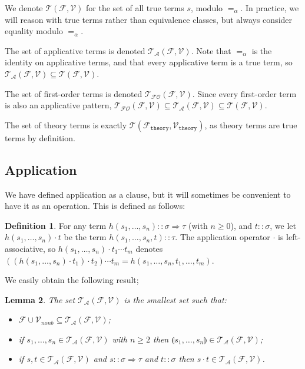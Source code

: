 \documentclass{lmcs}
\theoremstyle{theorem}\newtheorem{theorem}{Theorem}
\theoremstyle{theorem}\newtheorem{lemma}[theorem]{Lemma}
\theoremstyle{theorem}\newtheorem{corollary}[theorem]{Corollary}
\theoremstyle{definition}\newtheorem{definition}[theorem]{Definition}
\theoremstyle{definition}\newtheorem{example}[theorem]{Example}
\newcommand{\F}{\mathcal{F}}
\newcommand{\thF}{\mathcal{F}_{\mathtt{theory}}}
\newcommand{\V}{\mathcal{V}}
\newcommand{\thV}{\mathcal{V}_{\mathtt{theory}}}
\newcommand{\Vfree}{\mathcal{V}_{\mathit{nonb}}}
\newcommand{\Terms}{\mathcal{T}}
\newcommand{\ATerms}{\mathcal{T}_{\mathcal{A}}}
\newcommand{\FOTerms}{\mathcal{T}_{\mathcal{FO}}}
\newcommand{\atype}{\sigma}
\newcommand{\btype}{\tau}
\newcommand{\tuple}[2]{\llparenthesis #1,\dots,#2 \rrparenthesis}
\newcommand{\arrtype}{\Rightarrow}
\begin{document}
We denote $\Terms(\F,\V)$ for the set of all true terms $s$, modulo $=_\alpha$.
In practice, we will reason with true terms rather than equivalence classes, but
always consider equality modulo $=_\alpha$.

The set of applicative terms is denoted $\ATerms(\F,\V)$.  Note that $=_\alpha$
is the identity on applicative terms, and that every applicative term is a true
term, so $\ATerms(\F,\V) \subseteq \Terms(\F,\V)$.

The set of first-order terms is denoted $\FOTerms(\F,\V)$.  Since every
first-order term is also an applicative pattern, $\FOTerms(\F,\V) \subseteq
\ATerms(\F,\V) \subseteq \Terms(\F,\V)$.

The set of theory terms is exactly $\Terms(\thF,\thV)$, as theory terms are
true terms by definition.

\subsection{Application}\label{subsec:application}
We have defined application as a clause, but it will sometimes be convenient to
have it as an operation.  This is defined as follows:

\begin{definition}
For any term $h(s_1,\dots,s_n) :: \atype \arrtype \btype$ (with $n \geq 0$),
and $t :: \atype$, we let $h(s_1,\dots,s_n) \cdot t$ be the term
$h(s_1,\dots,s_n,t) :: \btype$.
The application operator $\cdot$ is left-associative, so $h(s_1,\dots,s_n)
\cdot t_1 \cdots t_m$ denotes $((h(s_1,\dots,s_n) \cdot t_1) \cdot t_2) \cdots
t_m = h(s_1,\dots,s_n,t_1,\dots,t_m)$.
\end{definition}

We easily obtain the following result;

\begin{lemma}\label{lem:applicative_notation}
The set $\ATerms(\F,\V)$ is the smallest set such that:
\begin{itemize}
\item $\F \cup \Vfree \subseteq \ATerms(\F,\V)$;
\item if $s_1,\dots,s_n \in \ATerms(\F,\V)$ with $n \geq 2$ then
  $\tuple{s_1}{s_n} \in \ATerms(\F,\V)$;
\item if $s,t \in \ATerms(\F,\V)$ and $s :: \atype \arrtype \btype$ and $t ::
  \atype$ then $s \cdot t \in \ATerms(\F,\V)$.
\end{itemize}
\end{lemma}
\end{document}
